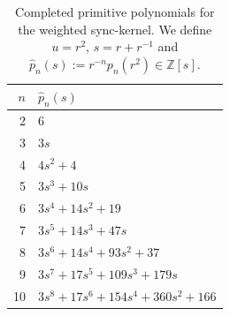 \begin{table}[H]
\centering
\scriptsize
\setlength{\tabcolsep}{6pt}
\caption{Completed primitive polynomials for the weighted sync-kernel. We define $u=r^2$, $s=r+r^{-1}$ and $\widehat p_n(s):=r^{-n}p_n(r^2)\in\mathbb Z[s]$.}
\label{tab:sync_kernel_weighted_primitive_completed}
\begin{tabular}{r l}
\toprule
$n$ & $\widehat p_n(s)$\\
\midrule
2 & $6$\\
3 & $3 s$\\
4 & $4 s^{2} + 4$\\
5 & $3 s^{3} + 10 s$\\
6 & $3 s^{4} + 14 s^{2} + 19$\\
7 & $3 s^{5} + 14 s^{3} + 47 s$\\
8 & $3 s^{6} + 14 s^{4} + 93 s^{2} + 37$\\
9 & $3 s^{7} + 17 s^{5} + 109 s^{3} + 179 s$\\
10 & $3 s^{8} + 17 s^{6} + 154 s^{4} + 360 s^{2} + 166$\\
\bottomrule
\end{tabular}
\end{table}

